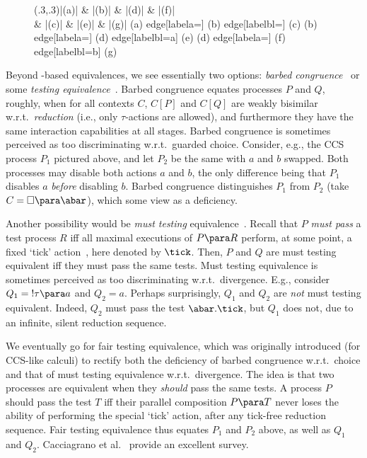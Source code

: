 \documentclass{LMCS}
\theoremstyle{plain}\newtheorem{satz}[thm]{Satz}
\begin{document}
\begin{wrapfigure}[3]{r}{0pt}
  \begin{minipage}[c]{0.23\linewidth}
    \vspace*{-1.5em}
    \diag(.3,.3){|(a)| \bullet \& |(b)| \bullet \& |(d)| \bullet
      \& |(f)| \bullet \\
      \& |(c)| \bullet \& |(e)| \bullet \& |(g)| \bullet }{(a) edge[labela={\tau}] (b) edge[labelbl={\tau}] (c) (b) edge[labela={\tau}] (d) edge[labelbl={a}] (e) (d) edge[labela={\tau}] (f) edge[labelbl={b}] (g) }
\end{minipage}
\end{wrapfigure}
Beyond \lts{}-based
equivalences, we see essentially two options: \emph{barbed
  congruence}~\cite{DBLP:books/daglib/0004377} or some \emph{testing
  equivalence}~\cite{DBLP:journals/tcs/NicolaH84}.
Barbed congruence equates processes $P$ and $Q$, roughly, when for all
contexts $C$, $C[P]$ and $C[Q]$ are weakly bisimilar w.r.t.\
\emph{reduction} (i.e., only $\tau$-actions are allowed), and
furthermore they have the same interaction capabilities at all
stages. Barbed congruence is sometimes perceived as too discriminating
w.r.t.\ guarded choice. Consider, e.g., the CCS process $P_1$ pictured
above, and let $P_2$ be the same with $a$ and $b$ swapped.  Both
processes may disable both actions $a$ and $b$, the only difference
being that $P_1$ disables $a$ \emph{before} disabling $b$.  Barbed
congruence distinguishes $P_1$ from $P_2$ (take $C = \square \para
\abar$), which some view as a deficiency.

Another possibility would be \emph{must testing}
equivalence~\cite{DBLP:journals/tcs/NicolaH84}.  Recall that $P$
\emph{must pass} a test process $R$ iff all maximal executions of
$P \para R$ perform, at some point, a fixed `tick'
action~\cite{DBLP:journals/iandc/Gorla10}, here denoted by $\tick$.
Then, $P$ and $Q$ are must testing equivalent iff they must
pass the same tests.  Must testing equivalence is sometimes perceived
as too discriminating w.r.t.\ divergence.  E.g., consider $Q_1 =
{!\tau} \para a$ and $Q_2 = a$. Perhaps surprisingly, $Q_1$ and $Q_2$
are \emph{not} must testing equivalent. Indeed, $Q_2$ must pass the
test $\abar.\tick$, but $Q_1$ does not, due to an infinite, silent
reduction sequence.

We eventually go for fair testing equivalence, which was originally
introduced (for CCS-like calculi) to rectify both the deficiency of
barbed congruence w.r.t.\ choice and that of must testing equivalence
w.r.t.\ divergence.  The idea is that two processes are equivalent
when they \emph{should} pass the same tests. A process $P$
should pass the test $T$ iff their parallel composition $P \para T$
never loses the ability of performing the special `tick' action, after
any tick-free reduction sequence. Fair testing equivalence thus
equates $P_1$ and $P_2$ above, as well as $Q_1$ and $Q_2$.
Cacciagrano et al.~\cite{DBLP:journals/corr/abs-0904-2340} provide an
excellent survey.
\end{document}
